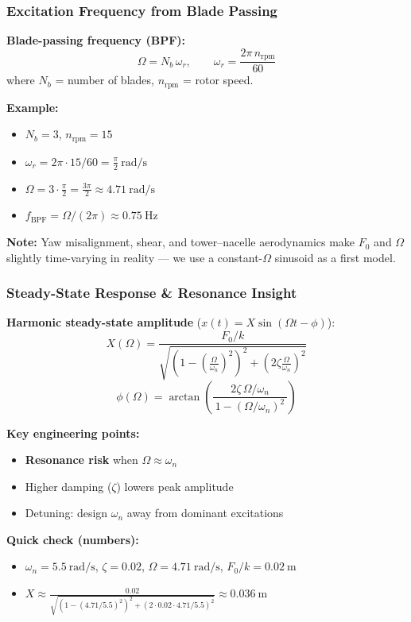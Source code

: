 \documentclass{beamer}
\begin{document}
\begin{frame}
    \frametitle{Excitation Frequency from Blade Passing}

    \textbf{Blade-passing frequency (BPF):}
    \[
    \Omega = N_b \,\omega_r, \qquad
    \omega_r = \frac{2\pi\,n_{\mathrm{rpm}}}{60}
    \]
    where $N_b$ = number of blades,\; $n_{\mathrm{rpm}}$ = rotor speed.

    \textbf{Example:}
    \begin{itemize}
        \item $N_b = 3$, \quad $n_{\mathrm{rpm}} = 15$
        \item $\omega_r = 2\pi \cdot 15/60 = \frac{\pi}{2}\ \mathrm{rad/s}$
        \item $\Omega = 3 \cdot \frac{\pi}{2} = \frac{3\pi}{2} \approx 4.71\ \mathrm{rad/s}$
        \item $f_{\mathrm{BPF}} = \Omega/(2\pi) \approx 0.75\ \mathrm{Hz}$
    \end{itemize}

    \textbf{Note:} Yaw misalignment, shear, and tower–nacelle aerodynamics make $F_0$ and $\Omega$ slightly time-varying in reality — we use a constant-$\Omega$ sinusoid as a first model.
\end{frame}

\begin{frame}
    \frametitle{Steady-State Response \& Resonance Insight}
{\small
    \textbf{Harmonic steady-state amplitude} ($x(t)=X\sin(\Omega t - \phi)$):
    \[
    X(\Omega) = \frac{F_0/k}{\sqrt{\left(1 - \left(\frac{\Omega}{\omega_n}\right)^2\right)^2 + \left(2\zeta \frac{\Omega}{\omega_n}\right)^2}}
    \]
    \[
    \phi(\Omega) = \arctan\!\left(\frac{2\zeta \,\Omega/\omega_n}{\,1 - (\Omega/\omega_n)^2\,}\right)
    \]

    \textbf{Key engineering points:}
    \begin{itemize}
        \item \textbf{Resonance risk} when $\Omega \approx \omega_n$
        \item Higher damping ($\zeta$) lowers peak amplitude
        \item Detuning: design $\omega_n$ away from dominant excitations
    \end{itemize}

    \textbf{Quick check (numbers):}
    \begin{itemize}
        \item $\omega_n = 5.5\ \mathrm{rad/s}$,\; $\zeta = 0.02$,\; $\Omega = 4.71\ \mathrm{rad/s}$,\; $F_0/k = 0.02\ \mathrm{m}$
        \item $X \approx \frac{0.02}{\sqrt{(1-(4.71/5.5)^2)^2 + (2\cdot 0.02\cdot 4.71/5.5)^2}} \approx 0.036\ \mathrm{m}$
    \end{itemize}
}
\end{frame}
\end{document}
